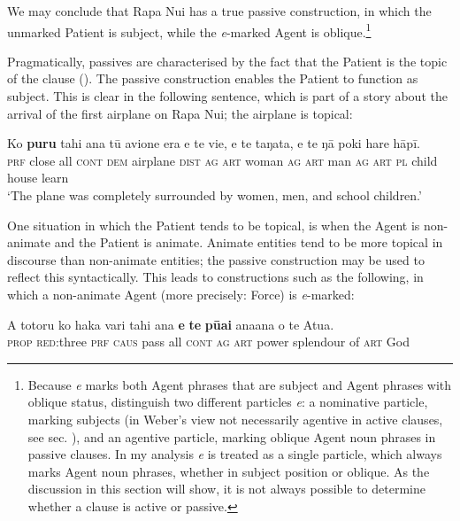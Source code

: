 We may conclude that Rapa Nui has a true passive construction, in which the unmarked Patient is subject, while the \textit{e}{}-marked Agent is oblique.\footnote{\label{fn:414}Because \textit{e} marks both Agent phrases that are subject and Agent phrases with oblique status, \citet[60]{WeberN2003} distinguish two different particles \textit{e}: a nominative particle, marking subjects (in Weber’s view not necessarily agentive in active clauses, see sec. ), and an agentive particle, marking oblique Agent noun phrases in passive clauses. In my analysis \textit{e} is treated as a single particle, which always marks Agent noun phrases, whether in subject position or oblique. As the discussion in this section will show, it is not always possible to determine whether a clause is active or passive.} 

Pragmatically, passives are characterised by the fact that the Patient is the topic of the clause (\citealt[326]{KeenanDryer2007}). The passive construction enables the Patient to function as subject. This is clear in the following sentence, which is part of a story about the arrival of the first airplane on Rapa Nui; the airplane is topical:

\ea\label{ex:8.53}
\gll Ko \textbf{puru} tahi {\ꞌ}ana tū {\ꞌ}avione era e te vi{\ꞌ}e, e te taŋata, e te ŋā poki hare hāpī.\\
\textsc{prf} close all \textsc{cont} \textsc{dem} airplane \textsc{dist} \textsc{ag} \textsc{art} woman \textsc{ag} \textsc{art} man \textsc{ag} \textsc{art} \textsc{pl} child house learn\\

\glt
‘The plane was completely surrounded by women, men, and school children.’ \textstyleExampleref{[R379.012]} 
\z

One situation in which the Patient tends to be topical, is when the Agent is non-animate and the Patient is animate. Animate entities tend to be more topical in discourse than non-animate entities; the passive construction may be used to reflect this syntactically. This leads to constructions such as the following, in which a non-animate Agent (more precisely: Force) is \textit{e}{}-marked:

\ea\label{ex:8.54}
\gll A totoru ko haka vari tahi {\ꞌ}ana \textbf{e} \textbf{te} \textbf{pūai} {\ꞌ}ana{\ꞌ}ana o te {\ꞌ}Atua.\\
\textsc{prop} \textsc{red}:three \textsc{prf} \textsc{caus} pass all \textsc{cont} \textsc{ag} \textsc{art} power splendour of \textsc{art} God\\

